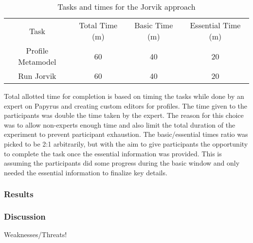 \begin{table}
    \caption{Tasks and times for the Jorvik approach}
    \centering
    \setlength{\tabcolsep}{3.5pt} 
    \begin{tabular}{|c|c|c|c|}
        Task & Total Time (m) & Basic Time (m) & Essential Time (m) \\ 
        Profile Metamodel & 60 & 40 & 20 \\
        Run Jorvik & 60 & 40 & 20 \\
    \end{tabular}
\end{table}



Total allotted time for completion is based on timing the tasks while done by an expert on Papyrus and creating custom editors for profiles.
The time given to the participants was double the time taken by the expert.
The reason for this choice was to allow non-experts enough time and also limit the total duration of the experiment to prevent participant exhaustion.
The basic/essential times ratio was picked to be 2:1 arbitrarily, but with the aim to give participants the opportunity to complete the task once the essential information was provided.
This is assuming the participants did some progress during the basic window and only needed the essential information to finalize key details.

\subsubsection{Results}



\subsubsection{Discussion}
Weaknesses/Threats!


